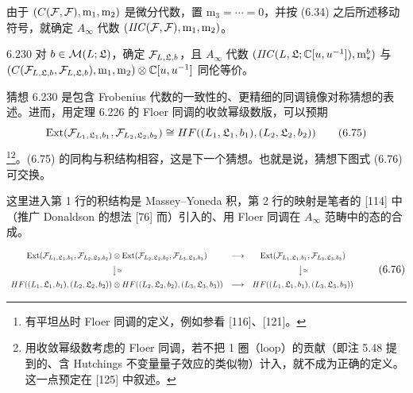 由于 $(C(\mathcal{F},\mathcal{F}),\mathrm{m}_1,\mathrm{m}_2)$ 是微分代数，置 $\mathrm{m}_3=\cdots=0$，并按 (6.34) 之后所述移动符号，就确定 $A_{\infty}$ 代数 $(\mathit{IIC}(\mathcal{F},\mathcal{F}),\mathrm{m}_1,\mathrm{m}_2)$。

\begin{conjecture}{6.230}
  对 $b\in\mathcal{M}(L;\mathfrak{L})$，确定 $\mathcal{F}_{L,\mathfrak{L},b}$，且 $A_{\infty}$ 代数 $(\mathit{IIC}(L,\mathfrak{L};\mathbb{C}[u,u^{-1}]),\mathrm{m}^b_*)$ 与 $(C(\mathcal{F}_{L,\mathfrak{L},b},\mathcal{F}_{L,\mathfrak{L},b}),\mathrm{m}_1,\mathrm{m}_2)\otimes\mathbb{C}[u,u^{-1}]$ 同伦等价。
\end{conjecture}

猜想 6.230 是包含 Frobenius 代数的一致性的、更精细的同调镜像对称猜想的表述。进而，用定理 6.226 的 Floer 同调的收敛幂级数版，可以预期
\begin{equation}
  \operatorname{Ext}(\mathcal{F}_{L_1,\mathfrak{L}_1,b_1},\mathcal{F}_{L_2,\mathfrak{L}_2,b_2})\cong HF((L_1,\mathfrak{L}_1,b_1),(L_2,\mathfrak{L}_2,b_2)) \tag{6.75}
\end{equation}
\footnote{有平坦丛时 Floer 同调的定义，例如参看 [116]、[121]。}\footnote{用收敛幂级数考虑的 Floer 同调，若不把 1 圈（loop）的贡献（即注 5.48 提到的、含 Hutchings 不变量量子效应的类似物）计入，就不成为正确的定义。这一点预定在 [125] 中叙述。}。(6.75) 的同构与积结构相容，这是下一个猜想。也就是说，猜想下图式 (6.76) 可交换。

这里进入第 1 行的积结构是 Massey–Yoneda 积，第 2 行的映射是笔者的 [114] 中（推广 Donaldson 的想法 [76] 而）引入的、用 Floer 同调在 $A_{\infty}$ 范畴中的态的合成。

\begin{equation}
  \resizebox{0.97\linewidth}{!}{$\displaystyle \begin{array}{ccc} \operatorname{Ext}(\cF_{L_1,\mathfrak{L}_1,b_1},\cF_{L_2,\mathfrak{L}_2,b_2}) \otimes\operatorname{Ext}(\cF_{L_2,\mathfrak{L}_2,b_2},\cF_{L_3,\mathfrak{L}_3,b_3}) & \longrightarrow & \operatorname{Ext}(\cF_{L_1,\mathfrak{L}_1,b_1},\cF_{L_3,\mathfrak{L}_3,b_3})\\[2mm] \big\downarrow{\scriptstyle\cong} & & \big\downarrow{\scriptstyle\cong}\\[2mm] HF((L_1,\mathfrak{L}_1,b_1),(L_2,\mathfrak{L}_2,b_2)) \otimes HF((L_2,\mathfrak{L}_2,b_2),(L_3,\mathfrak{L}_3,b_3)) & \longrightarrow & HF((L_1,\mathfrak{L}_1,b_1),(L_3,\mathfrak{L}_3,b_3)) \end{array} $} \tag{6.76}
\end{equation}

